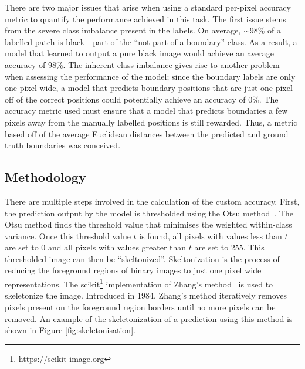 There are two major issues that arise when using a standard per-pixel accuracy metric to quantify the performance achieved in this task. The first issue stems from the severe class imbalance present in the labels. On average, ${\sim}$98\% of a labelled patch is black---part of the ``not part of a boundary'' class. As a result, a model that learned to output a pure black image would achieve an average accuracy of 98\%. The inherent class imbalance gives rise to another problem when assessing the performance of the model; since the boundary labels are only one pixel wide, a model that predicts boundary positions that are just one pixel off of the correct positions could potentially achieve an accuracy of 0\%. The accuracy metric used must ensure that a model that predicts boundaries a few pixels away from the manually labelled positions is still rewarded. Thus, a metric based off of the average Euclidean distances between the predicted and ground truth boundaries was conceived.

\subsection{Methodology}

There are multiple steps involved in the calculation of the custom accuracy. First, the prediction output by the model is thresholded using the Otsu method~\cite{otsu}. The Otsu method finds the threshold value that minimises the weighted within-class variance. Once this threshold value $t$ is found, all pixels with values less than $t$ are set to 0 and all pixels with values greater than $t$ are set to 255. This thresholded image can then be ``skeltonized''. Skeltonization is the process of reducing the foreground regions of binary images to just one pixel wide representations. The scikit\footnote{\url{https://scikit-image.org}} implementation of Zhang's method~\cite{zhang} is used to skeletonize the image. Introduced in 1984, Zhang's method iteratively removes pixels present on the foreground region borders until no more pixels can be removed. An example of the skeletonization of a prediction using this method is shown in Figure \ref{fig:skeletonisation}.

